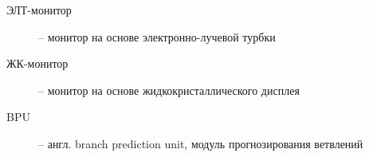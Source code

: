 
\begin{description}
\item[ЭЛТ-монитор] -- монитор на основе электронно-лучевой турбки
\item[ЖК-монитор] -- монитор на основе жидкокристаллического дисплея
\item[BPU] -- англ. branch prediction unit, модуль прогнозирования ветвлений
\end{description}

\clearpage


\clearpage
